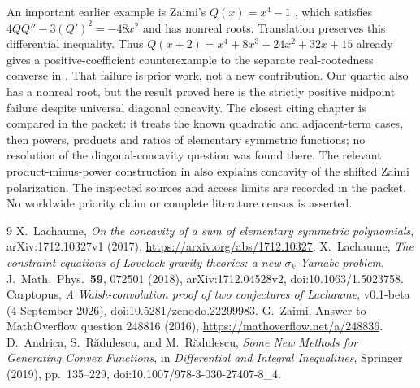 \documentclass[11pt]{article}
\begin{document}
An important earlier example is Zaimi's $Q(x)=x^4-1$ \cite{Z}, which
satisfies $4QQ''-3(Q')^2=-48x^2$ and has nonreal roots.
Translation preserves this differential inequality. Thus
$Q(x+2)=x^4+8x^3+24x^2+32x+15$ already gives a positive-coefficient
counterexample to the separate real-rootedness converse in
\cite[Conjecture~3]{L17}. That failure is prior work, not a new contribution.
Our quartic also has a nonreal root, but the result proved here is the
strictly positive midpoint failure despite universal diagonal concavity.
The closest citing chapter \cite[Section~5, pp.~166--183]{AR}
is compared in the packet: it treats the known quadratic and adjacent-term
cases, then powers, products and ratios of elementary symmetric functions;
no resolution of the diagonal-concavity question was found there.
The relevant product-minus-power construction in \cite[Theorem~4.17]{AR}
also explains concavity of the shifted Zaimi polarization.
The inspected sources and access limits are recorded in the packet.
No worldwide priority claim or complete literature census is asserted.

\begin{thebibliography}{9}
 X.~Lachaume,
\emph{On the concavity of a sum of elementary symmetric polynomials},
arXiv:1712.10327v1 (2017),
\url{https://arxiv.org/abs/1712.10327}.
 X.~Lachaume,
\emph{The constraint equations of Lovelock gravity theories:
a new $\sigma_k$-Yamabe problem}, J.~Math.~Phys.~\textbf{59}, 072501 (2018),
arXiv:1712.04528v2, doi:10.1063/1.5023758.
 Carptopus,
\emph{A Walsh-convolution proof of two conjectures of Lachaume},
v0.1-beta (4 September 2026), doi:10.5281/zenodo.22299983.
 G.~Zaimi, Answer to MathOverflow question 248816 (2016),
\url{https://mathoverflow.net/a/248836}.
 D.~Andrica, S.~R\u{a}dulescu, and M.~R\u{a}dulescu,
\emph{Some New Methods for Generating Convex Functions},
in \emph{Differential and Integral Inequalities}, Springer (2019), pp.~135--229,
doi:10.1007/978-3-030-27407-8\_4.
\end{thebibliography}
\end{document}
